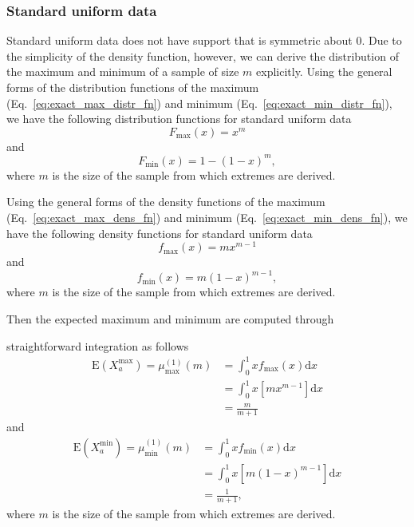 \documentclass[aoas]{imsart}
\begin{document}
\subsubsection{Standard uniform data}

Standard uniform data does not have support that is symmetric about 0. Due to the simplicity of the density function, however, we can derive the distribution of the maximum and minimum of a sample of size $m$ explicitly. Using the general forms of the distribution functions of the maximum (Eq.~\ref{eq:exact_max_distr_fn}) and minimum (Eq.~\ref{eq:exact_min_distr_fn}), we have the following distribution functions for standard uniform data
%
\begin{equation}\label{eq:uniform_max_distr}
F_\text{max}(x) = x^m
\end{equation}
%
and
%
\begin{equation}\label{eq:uniform_min_distr}
F_\text{min}(x) = 1 - (1 - x)^m,
\end{equation}
%
where $m$ is the size of the sample from which extremes are derived.

Using the general forms of the density functions of the maximum (Eq.~\ref{eq:exact_max_dens_fn}) and minimum (Eq.~\ref{eq:exact_min_dens_fn}), we have the following density functions for standard uniform data
%
\begin{equation}\label{eq:uniform_max_dens}
f_\text{max}(x) = m x^{m-1}
\end{equation}
%
and
%
\begin{equation}\label{eq:uniform_min_dens}
f_\text{min}(x) = m(1 - x)^{m-1},
\end{equation}
%
where $m$ is the size of the sample from which extremes are derived.

Then the expected maximum and minimum are computed through 

\noindent straightforward integration as follows
%
\begin{equation}\label{eq:mu_max_uniform}
\begin{aligned}
\text{E}(X^\text{max}_a) = \mu^{(1)}_\text{max}(m) &= \int_{0}^{1} x f_\text{max}(x) \text{d}x \\
&= \int_{0}^{1} x [m x^{m-1}] \text{d}x \\
&= \frac{m}{m+1}
\end{aligned}
\end{equation}
%
and
%
\begin{equation}\label{eq:mu_min_uniform}
\begin{aligned}
\text{E}(X^\text{min}_a) = \mu^{(1)}_\text{min}(m) &= \int_{0}^{1} x f_\text{min}(x) \text{d}x \\
&= \int_{0}^{1} x [m (1 - x)^{m-1}] \text{d}x \\
&= \frac{1}{m+1},
\end{aligned}
\end{equation}
%
where $m$ is the size of the sample from which extremes are derived.
\end{document}
